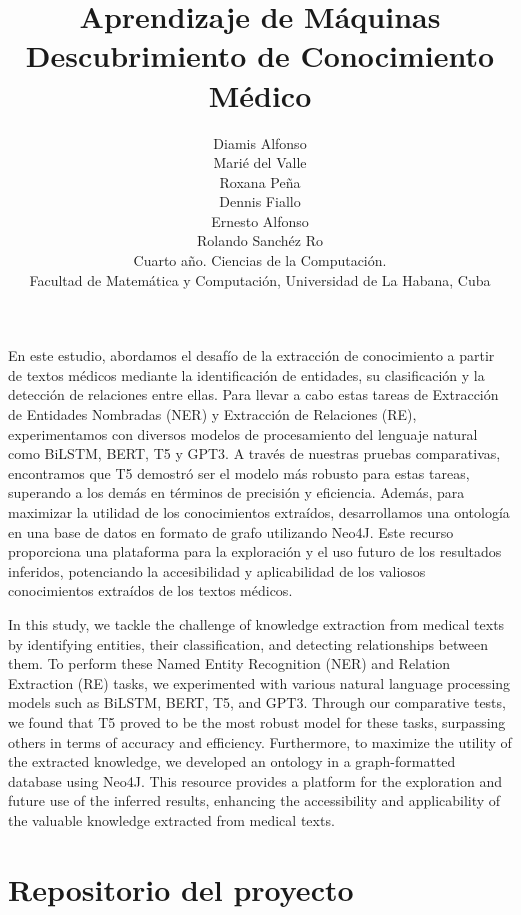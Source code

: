 \documentclass[10pt]{article} %
\title{\normalsize{Aprendizaje de M\'aquinas}\\
	\Huge\bfseries Descubrimiento de Conocimiento M\'edico \\
} %
\author{%
	Diamis Alfonso \\ Mari\'e del Valle \\ Roxana Pe\~na \\ Dennis Fiallo \\ Ernesto Alfonso \\ Rolando Sanch\'ez
	Ro \vspace{1em} \\
	\small Cuarto a\~no. Ciencias de la Computaci\'on. \\ %
	\small Facultad de Matem\'atica y Computaci\'on, Universidad de La Habana, Cuba \\ %
}
\date{} %
\renewenvironment{abstract}
{\small
	\begin{center}
		\bfseries \abstractname\vspace{-.5em}\vspace{0pt}
	\end{center}
	\list{}{
		\setlength{\leftmargin}{1.5cm}%
		\setlength{\rightmargin}{\leftmargin}%
	}%
	\item\relax}
{\endlist}
\begin{document}
	\maketitle
	
	\begin{abstract}		
		En este estudio, abordamos el desafío de la extracción de conocimiento a partir de textos médicos mediante la identificación de entidades, su clasificación y la detección de relaciones entre ellas. Para llevar a cabo estas tareas de Extracción de Entidades Nombradas (NER) y Extracción de Relaciones (RE), experimentamos con diversos modelos de procesamiento del lenguaje natural como BiLSTM, BERT, T5 y GPT3. A través de nuestras pruebas comparativas, encontramos que T5 demostró ser el modelo más robusto para estas tareas, superando a los demás en términos de precisión y eficiencia. Además, para maximizar la utilidad de los conocimientos extraídos, desarrollamos una ontología en una base de datos en formato de grafo utilizando Neo4J. Este recurso proporciona una plataforma para la exploración y el uso futuro de los resultados inferidos, potenciando la accesibilidad y aplicabilidad de los valiosos conocimientos extraídos de los textos médicos.	
	\end{abstract}

	\begin{abstract}		
	In this study, we tackle the challenge of knowledge extraction from medical texts by identifying entities, their classification, and detecting relationships between them. To perform these Named Entity Recognition (NER) and Relation Extraction (RE) tasks, we experimented with various natural language processing models such as BiLSTM, BERT, T5, and GPT3. Through our comparative tests, we found that T5 proved to be the most robust model for these tasks, surpassing others in terms of accuracy and efficiency. Furthermore, to maximize the utility of the extracted knowledge, we developed an ontology in a graph-formatted database using Neo4J. This resource provides a platform for the exploration and future use of the inferred results, enhancing the accessibility and applicability of the valuable knowledge extracted from medical texts.
	\end{abstract}

	\section{Repositorio del proyecto}
	
\end{document}
